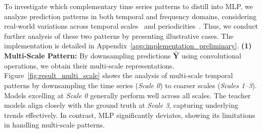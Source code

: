To investigate which complementary time series patterns to distill into MLP, we analyze prediction patterns in both temporal and frequency domains, considering real-world variations across temporal scales~\cite{timemixer} and periodicities~\cite{timesnet}. Thus, we conduct further analysis of these two patterns by presenting illustrative cases. The implementation is detailed in Appendix~\ref{app:implementation_preliminary}. 
\textbf{(1) Multi-Scale Pattern:}  
By downsampling predictions \(\mathbf{\hat{Y}}\) using convolutional operations, we obtain their multi-scale representations. Figure~\ref{fig:result_multi_scale} shows the analysis of multi-scale temporal patterns by downsampling the time series (\textit{Scale 0}) to coarser scales (\textit{Scales 1–3}). Models excelling at \textit{Scale 0} generally perform well across all scales. The teacher models align closely with the ground truth at \textit{Scale 3}, capturing underlying trends effectively. In contrast, MLP significantly deviates, showing its limitations in handling multi-scale patterns.
